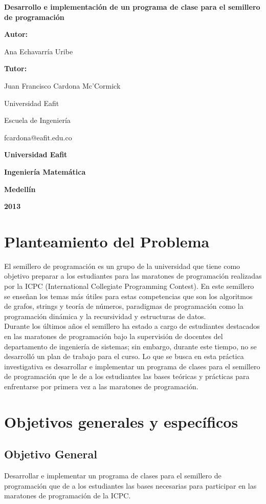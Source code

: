 \documentclass[11pt, oneside]{article}
\makeatletter
\theoremstyle{definition}
\theoremstyle{remark}
\newcommand\portada{
\begin{titlepage}
		\begin{center}
			{\large \bf Desarrollo e implementación de un programa de clase para el semillero de programación }
			\vfill
			{\large\bf Autor: \par}
			{\large Ana Echavarría Uribe\par}
			{\large\bf Tutor: \par}
			{\large Juan Francisco Cardona Mc'Cormick \par Universidad Eafit \par Escuela de Ingeniería \par fcardona@eafit.edu.co }
			\vfill
			{\large\bf Universidad Eafit  \par}
			{\large\bf Ingeniería Matemática \par}
			{\large\bf Medellín\par}
			{\large\bf 2013 \par}
		\end{center}
\end{titlepage}
}
\makeatother
\begin{document}
\portada


\renewcommand\contentsname{\centering Tabla de Contenidos}
\tableofcontents
\clearpage

\section{Planteamiento del Problema}
El semillero de programación es un grupo de la universidad que tiene como objetivo preparar a los estudiantes para las maratones de programación realizadas por la ICPC (International Collegiate Programming Contest). En este semillero se enseñan los temas más útiles para estas competencias que son los algoritmos de grafos, strings y teoría de números, paradigmas de programación como la programación dinámica y la recursividad y estructuras de datos.\\
Durante los últimos años el semillero ha estado a cargo de estudiantes destacados en las maratones de programación bajo la supervisión de docentes del departamento de ingeniería de sistemas; sin embargo, durante este tiempo, no se desarrolló un plan de trabajo para el curso. Lo que se busca en esta práctica investigativa es desarrollar e implementar un programa de clases para el semillero de programación que le de a los estudiantes las bases teóricas y prácticas para enfrentarse por primera vez a las maratones de programación.

\section{Objetivos generales y específicos}

\subsection{Objetivo General}
Desarrollar e implementar un programa de clases para el semillero de programación que de a los estudiantes las bases necesarias para participar en las maratones de programación de la ICPC.
\end{document}
